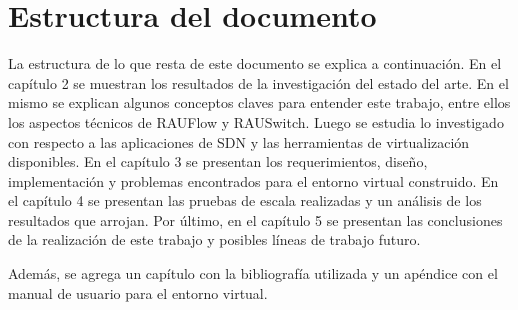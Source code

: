 \section{Estructura del documento}
La estructura de lo que resta de este documento se explica a continuación. En el capítulo 2 se muestran los resultados de la investigación del estado del arte. En el mismo se explican algunos conceptos claves para entender este trabajo, entre ellos los aspectos técnicos de RAUFlow y RAUSwitch. Luego se estudia lo investigado con respecto a las aplicaciones de SDN y las herramientas de virtualización disponibles. En el capítulo 3 se presentan los requerimientos, diseño, implementación y problemas encontrados para el entorno virtual construido. En el capítulo 4 se presentan las pruebas de escala realizadas y un análisis de los resultados que arrojan. Por último, en el capítulo 5 se presentan las conclusiones de la realización de este trabajo y posibles líneas de trabajo futuro.

Además, se agrega un capítulo con la bibliografía utilizada y un apéndice con el manual de usuario para el entorno virtual.

